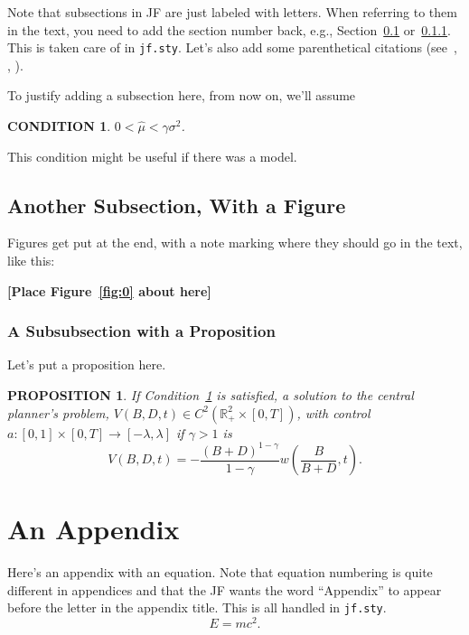 \documentclass[11pt]{article}
\newtheorem{condition}{CONDITION}
\newtheorem{proposition}{PROPOSITION}
\begin{document}
Note that subsections in JF are just labeled with letters.  When referring to them in the text, you need to add the section number back, e.g., Section~\ref{sec:subsec} or~\ref{sec:subsub}. This is taken care of in \texttt{jf.sty}. Let's also add some parenthetical citations (see~\cite{Stanton:95}, \cite{CarpenterStantonWallace:12}, \cite{Campbell:03}). 

To justify adding a subsection here, from now on, we'll assume
\begin{condition}\label{cond:rates}
$0 <  \hat{\mu} < \gamma\sigma^2$.
\vspace{3mm}
\end{condition}
This condition might be useful if there was a model. 

\subsection{Another Subsection, With a Figure}
\label{sec:subsec}

Figures get put at the end, with a note marking where they should go in the text, like this:

\bigskip
\centerline{\bf [Place Figure~\ref{fig:0} about here]}
\bigskip

\subsubsection{A Subsubsection with a Proposition}
\label{sec:subsub}

Let's put a proposition here.
\begin{proposition} \label{prop:3}
If Condition~\ref{cond:rates} is satisfied,  a solution to the central
planner's problem, $V(B,D,t) \in C^2\left( {\mathbb R}_{+}^2 \times
  [0,T] \right)$, with control $a:[0,1]\times[0,T]\rightarrow [-\lambda,\lambda]$
 if  $\gamma>1$ is
\begin{equation} \label{eq:valuea}
V(B,D,t) =  - \frac{(B+D)^{1-\gamma}}{1-\gamma}   w\left(\frac{B}{B+D},t\right).
\end{equation}
\end{proposition}

\clearpage

\appendix

\section{An Appendix}
\label{sec:app1}

Here's an appendix with an equation. Note that equation numbering is quite different in appendices and that the JF wants the word ``Appendix'' to appear before the letter in the appendix title. This is all handled in \texttt{jf.sty}.
\begin{equation}
  E = mc^2.
\label{eq:eqA}
\end{equation}
\end{document}
